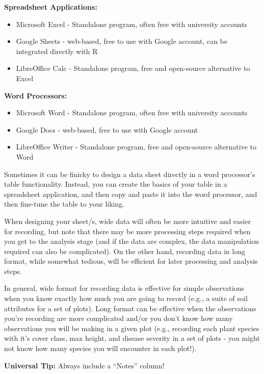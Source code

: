 \documentclass[
  letterpaper,
  DIV=11,
  numbers=noendperiod]{scrreprt}
\begin{document}
\textbf{Spreadsheet Applications:}

\begin{itemize}
\item
  Microsoft Excel - Standalone program, often free with university
  accounts
\item
  Google Sheets - web-based, free to use with Google account, can be
  integrated directly with R
\item
  LibreOffice Calc - Standalone program, free and open-source
  alternative to Excel
\end{itemize}

\textbf{Word Processors:}

\begin{itemize}
\item
  Microsoft Word - Standalone program, often free with university
  accounts
\item
  Google Docs - web-based, free to use with Google account
\item
  LibreOffice Writer - Standalone program, free and open-source
  alternative to Word
\end{itemize}

Sometimes it can be finicky to design a data sheet directly in a word
processor's table functionality. Instead, you can create the basics of
your table in a spreadsheet application, and then copy and paste it into
the word processor, and then fine-tune the table to your liking.

When designing your sheet/s, wide data will often be more intuitive and
easier for recording, but note that there may be more processing steps
required when you get to the analysis stage (and if the data are
complex, the data manipulation required can also be complicated). On the
other hand, recording data in long format, while somewhat tedious, will
be efficient for later processing and analysis steps.

In general, wide format for recording data is effective for simple
observations when you know exactly how much you are going to record
(e.g., a suite of soil attributes for a set of plots). Long format can
be effective when the observations you're recording are more complicated
and/or you don't know how many observations you will be making in a
given plot (e.g., recording each plant species with it's cover class,
max height, and disease severity in a set of plots - you might not know
how many species you will encounter in each plot!).

\textbf{Universal Tip:} Always include a ``Notes'' column!
\end{document}

